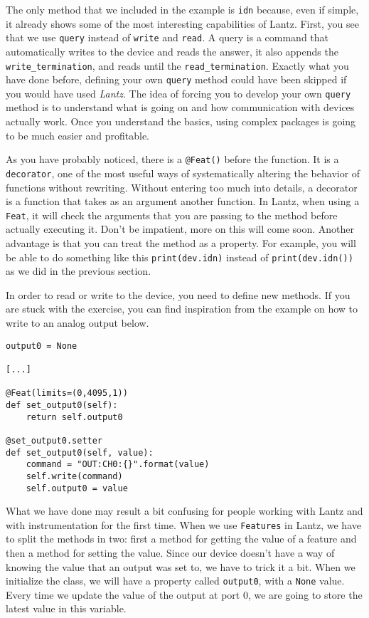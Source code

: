 The only method that we included in the example is \texttt{idn} because,
even if simple, it already shows some of the most interesting
capabilities of Lantz. First, you see that we use \texttt{query} instead
of \texttt{write} and \texttt{read}. A query is a command that
automatically writes to the device and reads the answer, it also appends
the \texttt{write\_termination}, and reads until the
\texttt{read\_termination}. Exactly what you have done before, defining
your own \texttt{query} method could have been skipped if you would have
used \emph{Lantz}. The idea of forcing you to develop your own
\texttt{query} method is to understand what is going on and how
communication with devices actually work. Once you understand the
basics, using complex packages is going to be much easier
and profitable.

As you have probably noticed, there is a \texttt{@Feat()} before the
function. It is a \texttt{decorator}, one of the most useful ways of
systematically altering the behavior of functions without rewriting.
Without entering too much into details, a decorator is a function that
takes as an argument another function. In Lantz, when using a
\texttt{Feat}, it will check the arguments that you are passing to the
method before actually executing it. Don't be impatient, more on this
will come soon. Another advantage is that you can treat the method as a
property. For example, you will be able to do something like this
\texttt{print(dev.idn)} instead of \texttt{print(dev.idn())} as we did
in the previous section.


In order to read or write to the device, you need to define new methods.
If you are stuck with the exercise, you can find inspiration from the
example on how to write to an analog output below.

\begin{verbatim}
output0 = None

[...]

@Feat(limits=(0,4095,1))
def set_output0(self):
    return self.output0

@set_output0.setter
def set_output0(self, value):
    command = "OUT:CH0:{}".format(value)
    self.write(command)
    self.output0 = value
\end{verbatim}

What we have done may result a bit confusing for people working with
Lantz and with instrumentation for the first time. When we use
\texttt{Features} in Lantz, we have to split the methods in two: first a
method for getting the value of a feature and then a method for setting
the value. Since our device doesn't have a way of knowing the value that
an output was set to, we have to trick it a bit. When we initialize the
class, we will have a property called \texttt{output0}, with a
\texttt{None} value. Every time we update the value of the output at
port 0, we are going to store the latest value in this variable.

